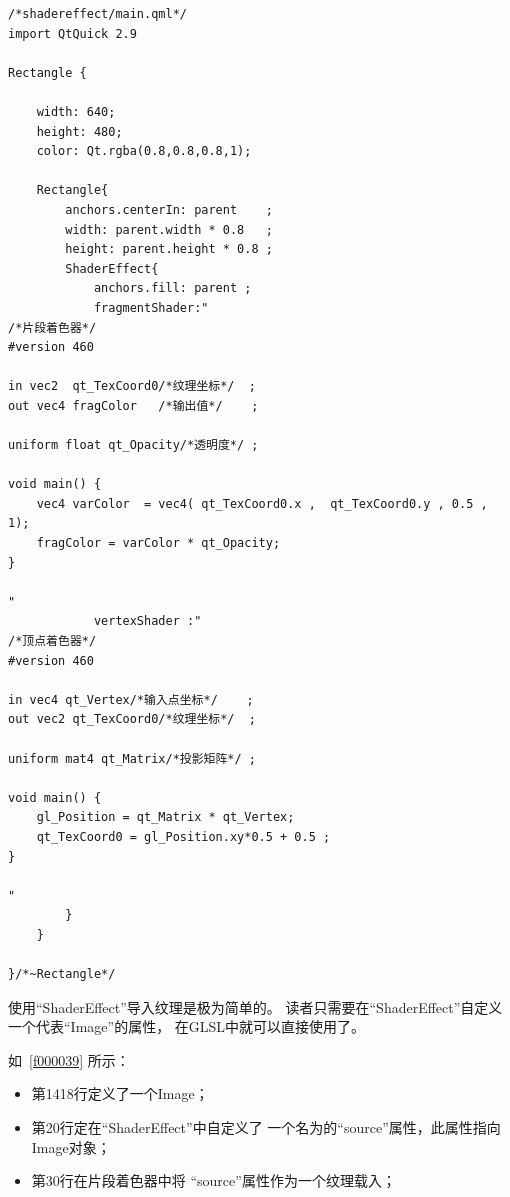 \FloatBarrier
\begin{lstlisting}[label=f000038,
caption=GoodLuck,
title=\lstlistingname\ \thelstlisting\marginnote{\fbox{\lstlistingname\ \thelstlisting}}
]
/*shadereffect/main.qml*/
import QtQuick 2.9

Rectangle {

    width: 640;
    height: 480;
    color: Qt.rgba(0.8,0.8,0.8,1);

    Rectangle{
        anchors.centerIn: parent    ;
        width: parent.width * 0.8   ;
        height: parent.height * 0.8 ;
        ShaderEffect{
            anchors.fill: parent ;
            fragmentShader:"
/*片段着色器*/
#version 460

in vec2  qt_TexCoord0/*纹理坐标*/  ;
out vec4 fragColor   /*输出值*/    ;

uniform float qt_Opacity/*透明度*/ ;

void main() {
    vec4 varColor  = vec4( qt_TexCoord0.x ,  qt_TexCoord0.y , 0.5 , 1);
    fragColor = varColor * qt_Opacity;
}

"
            vertexShader :"
/*顶点着色器*/
#version 460

in vec4 qt_Vertex/*输入点坐标*/    ;
out vec2 qt_TexCoord0/*纹理坐标*/  ;

uniform mat4 qt_Matrix/*投影矩阵*/ ;

void main() {
    gl_Position = qt_Matrix * qt_Vertex;
    qt_TexCoord0 = gl_Position.xy*0.5 + 0.5 ;
}

"
        }
    }

}/*~Rectangle*/
\end{lstlisting}          %


使用“ShaderEffect”导入纹理是极为简单的。
读者只需要在“ShaderEffect”自定义
一个代表“Image”的属性，
在GLSL中就可以直接使用了。

如\lstlistingname\ \ref{f000039}
所示：

\begin{itemize}

\item 第14\raisebox{0.16ex}{\sourcefonttwo\~{}}18行定义了一个Image；
\item 第20行定在“ShaderEffect”中自定义了
一个名为的“source”属性，此属性指向Image对象；
\item 第30行在片段着色器中将
“source”属性作为一个纹理载入；

\end{itemize}


